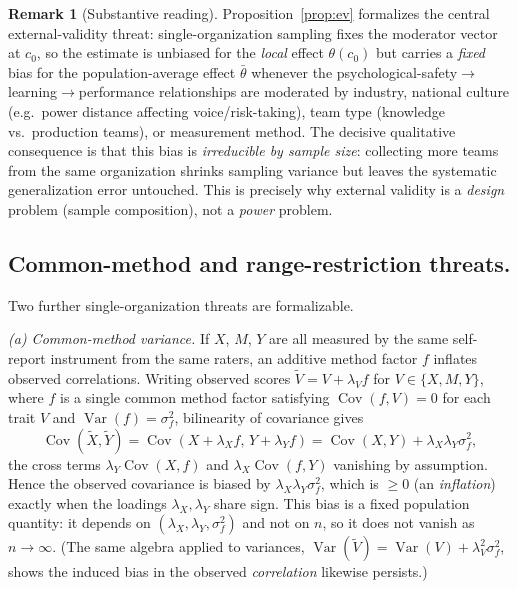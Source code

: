 \documentclass{amsart}
\theoremstyle{definition}
\newtheorem{remark}{Remark}
\begin{document}
\begin{remark}[Substantive reading]
Proposition~\ref{prop:ev} formalizes the central external-validity threat:
single-organization sampling fixes the moderator vector at $c_0$, so the
estimate is unbiased for the \emph{local} effect $\theta(c_0)$ but carries a
\emph{fixed} bias for the population-average effect $\bar\theta$ whenever the
psychological-safety$\to$learning$\to$performance relationships are moderated
by industry, national culture (e.g.\ power distance affecting
voice/risk-taking), team type (knowledge vs.\ production teams), or
measurement method. The decisive qualitative consequence is that this bias
is \emph{irreducible by sample size}: collecting more teams from the same
organization shrinks sampling variance but leaves the systematic
generalization error untouched. This is precisely why external validity is a
\emph{design} problem (sample composition), not a \emph{power} problem.
\end{remark}

\subsection*{Common-method and range-restriction threats.}
Two further single-organization threats are formalizable.

\emph{(a) Common-method variance.} If $X$, $M$, $Y$ are all measured by the
same self-report instrument from the same raters, an additive method factor
$f$ inflates observed correlations. Writing observed scores
$\tilde V = V + \lambda_V f$ for $V\in\{X,M,Y\}$, where $f$ is a single
common method factor satisfying $\operatorname{Cov}(f,V)=0$ for each trait
$V$ and $\operatorname{Var}(f)=\sigma_f^2$, bilinearity of covariance gives
\[
  \operatorname{Cov}(\tilde X,\tilde Y)
   = \operatorname{Cov}(X+\lambda_X f,\,Y+\lambda_Y f)
   = \operatorname{Cov}(X,Y) + \lambda_X\lambda_Y\sigma_f^2,
\]
the cross terms $\lambda_Y\operatorname{Cov}(X,f)$ and
$\lambda_X\operatorname{Cov}(f,Y)$ vanishing by assumption. Hence the
observed covariance is biased by $\lambda_X\lambda_Y\sigma_f^2$, which is
$\ge0$ (an \emph{inflation}) exactly when the loadings $\lambda_X,\lambda_Y$
share sign. This bias is a fixed population quantity: it depends on
$(\lambda_X,\lambda_Y,\sigma_f^2)$ and not on $n$, so it does not vanish as
$n\to\infty$. (The same algebra applied to variances,
$\operatorname{Var}(\tilde V)=\operatorname{Var}(V)+\lambda_V^2\sigma_f^2$,
shows the induced bias in the observed \emph{correlation} likewise persists.)
\end{document}
